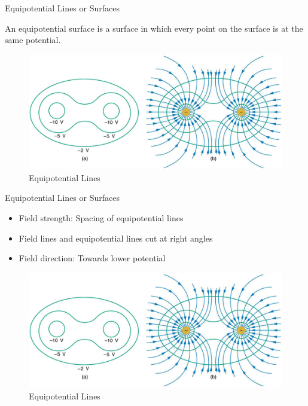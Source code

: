 \documentclass{beamer}
\begin{document}
\begin{frame}{Equipotential Lines or Surfaces}{}
\begin{definition}{}
An equipotential surface is a surface in which every point on the surface is at the same potential.
\end{definition}
\begin{figure}
\includegraphics[scale=0.2]{equipotential}
\caption{Equipotential Lines}
\end{figure}
\end{frame}

\begin{frame}{Equipotential Lines or Surfaces}{}
\begin{itemize}
  \item Field strength: Spacing of equipotential lines
  \item Field lines and equipotential lines cut at right angles
  \item Field direction: Towards lower potential
  \end{itemize}
\begin{figure}
\includegraphics[scale=0.2]{equipotential}
\caption{Equipotential Lines}
\end{figure}
\end{frame}
\end{document}
